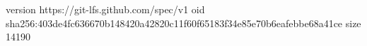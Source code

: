 version https://git-lfs.github.com/spec/v1
oid sha256:403de4fc636670b148420a42820c11f60f65183f34e85e70b6eafebbe68a41ce
size 14190
